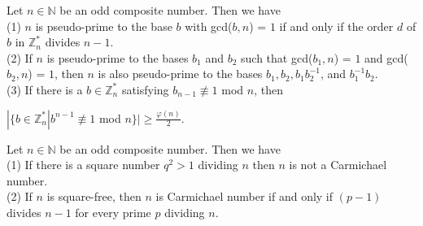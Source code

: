 \documentclass[a4paper]{article}
\begin{document}
\begin{theorem}
Let $n \in \mathbb{N}$ be an odd composite number. Then we have \\
(1) $n$ is pseudo-prime to the base $b$ with gcd($b,n$) = $1$ if and only if the order $d$ of $b$ in $\mathbb{Z}_{n}^{*}$ divides $n - 1$.\\
(2) If $n$ is pseudo-prime to the bases $b_{1}$ and $b_{2}$ such that gcd($b_{1}, n$) = $1$ and gcd($b_{2}, n$) = $1$, then $n$ is also pseudo-prime to the bases $b_{1}, b_{2}, b_{1}b_{2}^{-1}$, and $b_{1}^{-1}b_{2}$.\\
(3) If there is a $b \in \mathbb{Z}_{n}^{*}$ satisfying $b_{n - 1} \not \equiv 1$ mod $n$, then
\begin{center}
$|\{b \in \mathbb{Z}_{n}^{*}| b^{n - 1} \not \equiv 1$ mod $n \} | \geq \frac{\varphi (n)}{2}$.
\end{center}
\end{theorem}


\begin{theorem}
Let $n \in \mathbb{N}$ be an odd composite number. Then we have \\
(1) If there is a square number $q^{2} > 1$ dividing $n$ then $n$ is not a Carmichael number. \\
(2) If $n$ is square-free, then $n$ is Carmichael number if and only if $(p - 1)$ divides $n - 1$ for every prime $p$ dividing $n$.
\end{theorem}
\end{document}
